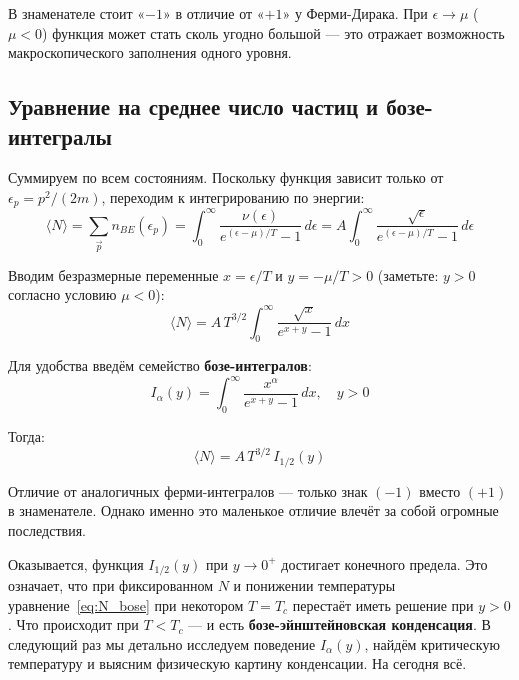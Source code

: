\documentclass[../general/general]{subfiles}
\begin{document}
В знаменателе стоит «$-1$» в отличие от «$+1$» у Ферми-Дирака. При $\epsilon \to \mu$ ($\mu < 0$) функция может стать сколь угодно большой --- это отражает возможность макроскопического заполнения одного уровня.

\subsection{Уравнение на среднее число частиц и бозе-интегралы}

Суммируем по всем состояниям. Поскольку функция зависит только от $\epsilon_p = p^2/(2m)$, переходим к интегрированию по энергии:
\begin{equation}
    \langle N\rangle = \sum_{\vec{p}} n_{BE}(\epsilon_p) = \int_0^\infty \frac{\nu(\epsilon)}{e^{(\epsilon-\mu)/T}-1}\, d\epsilon = A\int_0^\infty \frac{\sqrt{\epsilon}}{e^{(\epsilon-\mu)/T}-1}\, d\epsilon
\end{equation}

Вводим безразмерные переменные $x = \epsilon/T$ и $y = -\mu/T > 0$ (заметьте: $y > 0$ согласно условию $\mu < 0$):
\begin{equation}
    \langle N\rangle = A\,T^{3/2} \int_0^\infty \frac{\sqrt{x}}{e^{x+y}-1}\, dx
\end{equation}

Для удобства введём семейство \textbf{бозе-интегралов}:
\begin{equation}
    I_\alpha(y) = \int_0^\infty \frac{x^\alpha}{e^{x+y} - 1}\, dx, \quad y > 0
\end{equation}

Тогда:
\begin{equation}
    \langle N\rangle = A\,T^{3/2}\, I_{1/2}(y)
    \label{eq:N_bose}
\end{equation}

Отличие от аналогичных ферми-интегралов --- только знак $(-1)$ вместо $(+1)$ в знаменателе. Однако именно это маленькое отличие влечёт за собой огромные последствия.

Оказывается, функция $I_{1/2}(y)$ при $y \to 0^+$ достигает конечного предела. Это означает, что при фиксированном $N$ и понижении температуры уравнение~\eqref{eq:N_bose} при некотором $T = T_c$ перестаёт иметь решение при $y > 0$. Что происходит при $T < T_c$ --- и есть \textbf{бозе-эйнштейновская конденсация}. В следующий раз мы детально исследуем поведение $I_\alpha(y)$, найдём критическую температуру и выясним физическую картину конденсации. На сегодня всё.

\end{document}

